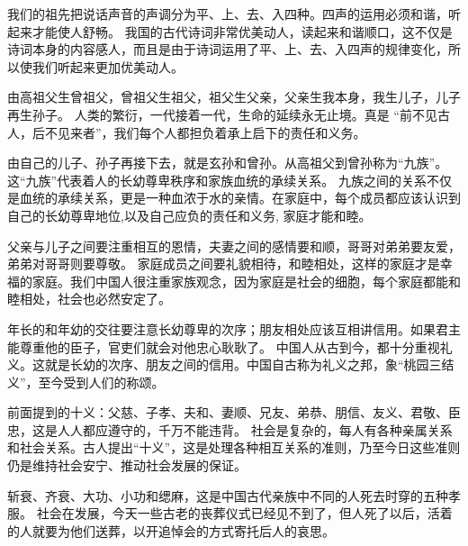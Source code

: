 \documentclass[avery5371,grid]{flashcards}
\begin{document}
{我们的祖先把说话声音的声调分为平、上、去、入四种。四声的运用必须和谐，听起来才能使人舒畅。} %
{我国的古代诗词非常优美动人，读起来和谐顺口，这不仅是诗词本身的内容感人，而且是由于诗词运用了平、上、去、入四声的规律变化，所以使我们听起来更加优美动人。} %

{由高祖父生曾祖父，曾祖父生祖父，祖父生父亲，父亲生我本身，我生儿子，儿子再生孙子。} %
{人类的繁衍，一代接着一代，生命的延续永无止境。真是 “前不见古人，后不见来者”，我们每个人都担负着承上启下的责任和义务。} %

{由自己的儿子、孙子再接下去，就是玄孙和曾孙。从高祖父到曾孙称为“九族”。这“九族”代表着人的长幼尊卑秩序和家族血统的承续关系。} %
{九族之间的关系不仅是血统的承续关系，更是一种血浓于水的亲情。在家庭中，每个成员都应该认识到自己的长幼尊卑地位,以及自己应负的责任和义务, 家庭才能和睦。} %

{父亲与儿子之间要注重相互的恩情，夫妻之间的感情要和顺，哥哥对弟弟要友爱，弟弟对哥哥则要尊敬。} %
{家庭成员之间要礼貌相待，和睦相处，这样的家庭才是幸福的家庭。我们中国人很注重家族观念，因为家庭是社会的细胞，每个家庭都能和睦相处，社会也必然安定了。} %

{年长的和年幼的交往要注意长幼尊卑的次序；朋友相处应该互相讲信用。如果君主能尊重他的臣子，官吏们就会对他忠心耿耿了。} %
{中国人从古到今，都十分重视礼义。这就是长幼的次序、朋友之间的信用。中国自古称为礼义之邦，象“桃园三结义”，至今受到人们的称颂。} %




{前面提到的十义：父慈、子孝、夫和、妻顺、兄友、弟恭、朋信、友义、君敬、臣忠，这是人人都应遵守的，千万不能违背。} %
{社会是复杂的，每人有各种亲属关系和社会关系。古人提出“十义”，这是处理各种相互关系的准则，乃至今日这些准则仍是维持社会安宁、推动社会发展的保证。} %

{斩衰、齐衰、大功、小功和缌麻，这是中国古代亲族中不同的人死去时穿的五种孝服。} %
{社会在发展，今天一些古老的丧葬仪式已经见不到了，但人死了以后，活着的人就要为他们送葬，以开追悼会的方式寄托后人的哀思。} %
\end{document}
